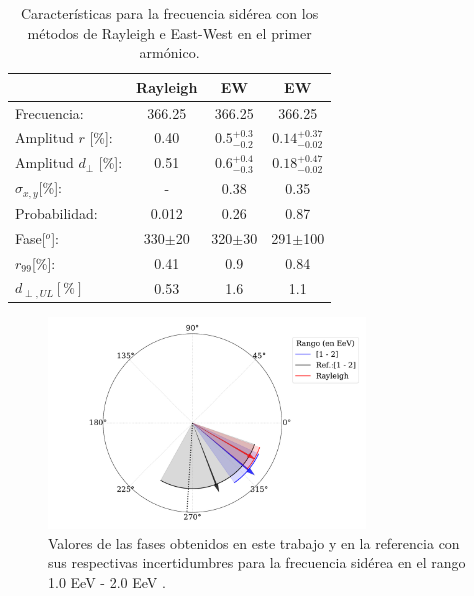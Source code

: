 \documentclass[11pt,papel,oneside,singlespace]{ibtesis}
\begin{document}
    \begin{table}[H]
        \begin{small}
            \begin{center}
                \begin{tabular}[c]{l|c||c|c}
                                            & Rayleigh    & EW            & EW\cite{Aab_2020}      \\\hline
                    Frecuencia:             & 366.25	  & 366.25        & 366.25        \\
                    Amplitud $r$ [\%]:      & 0.40	      & $0.5^{+0.3}_{-0.2}$           & $0.14^{+0.37}_{-0.02}$\cite{codigo}       \\
                    Amplitud $d_\perp$ [\%]:& 0.51        & $0.6^{+0.4}_{-0.3}$           & $0.18^{+0.47}_{-0.02}$       \\ 
                    $\sigma_{x,y}$[\%]:     & -	          & 0.38	        & 0.35          \\
                    Probabilidad:           & 0.012	      & 0.26          & 0.87          \\
                    Fase[$^o$]:             & 330$\pm$20  & 320$\pm$30    & 291$\pm$100 \cite{discrepancia}      \\
                    $r_{99}$[\%]:           & 0.41	      & 0.9           & 0.84\cite{codigo}        \\
                    $d_{\perp,UL}[\%]$      & 0.53        & 1.6           & 1.1        \\
                \end{tabular}
            \end{center}
        \end{small}
        \caption{Características para la frecuencia sidérea con los métodos de Rayleigh  e East-West en el primer armónico.}
        \label{tab:siderea_3}
    \end{table}
   
    \begin{figure}[H]
        \begin{small}
            \begin{center}
                \includegraphics[width=0.75\textwidth]{phase_tercer_bin.pdf}
            \end{center}
        \caption{Valores de las fases obtenidos en este trabajo y en la referencia con sus respectivas incertidumbres para la frecuencia sidérea en el  rango 1.0 EeV - 2.0 EeV .}
        \label{fig:tercer}
        \end{small}
    \end{figure}
\end{document}
